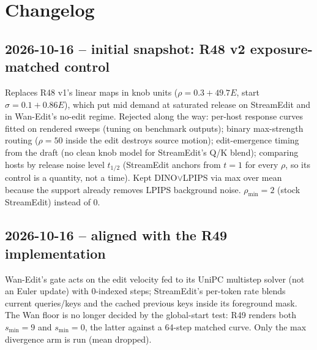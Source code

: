 \documentclass{article}
\begin{document}
\section{Changelog}
\subsection*{2026-10-16 -- initial snapshot: R48 v2 exposure-matched control}
Replaces R48 v1's linear maps in knob units ($\rho=0.3+49.7E$, start $\sigma=0.1+0.86E$), which put mid demand at saturated release on StreamEdit and in Wan-Edit's no-edit regime. Rejected along the way: per-host response curves fitted on rendered sweeps (tuning on benchmark outputs); binary max-strength routing ($\rho=50$ inside the edit destroys source motion); edit-emergence timing from the draft (no clean knob model for StreamEdit's Q/K blend); comparing hosts by release noise level $t_{1/2}$ (StreamEdit anchors from $t=1$ for every $\rho$, so its control is a quantity, not a time). Kept DINO$\lor$LPIPS via max over mean because the support already removes LPIPS background noise. $\rho_{\min}=2$ (stock StreamEdit) instead of 0.
\subsection*{2026-10-16 -- aligned with the R49 implementation}
Wan-Edit's gate acts on the edit velocity fed to its UniPC multistep solver (not an Euler update) with 0-indexed steps; StreamEdit's per-token rate blends current queries/keys and the cached previous keys inside its foreground mask. The Wan floor is no longer decided by the global-start test: R49 renders both $s_{\min}=9$ and $s_{\min}=0$, the latter against a 64-step matched curve. Only the max divergence arm is run (mean dropped).
\end{document}

